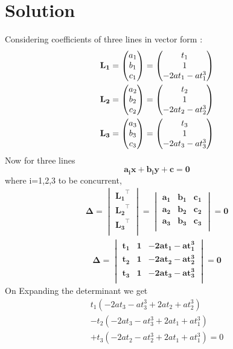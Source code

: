 \documentclass[journal,12pt,twocolumn]{IEEEtran}
\begin{document}
\section*{\textbf{Solution}}
\noindent
Considering coefficients of three lines in vector form :
\begin{align}
   \mathbf{\mathbf{L_1}=\begin{pmatrix}a_1\\b_1\\c_1\end{pmatrix}=\begin{pmatrix}t_1\\1\\-2at_1-at_1^3\end{pmatrix}}\\
   \mathbf{\mathbf{L_2}=\begin{pmatrix}a_2\\b_2\\c_2\end{pmatrix}=\begin{pmatrix}t_2\\1\\- 2at_2 -at_2^3\end{pmatrix}}\\
   \mathbf{\mathbf{L_3}=\begin{pmatrix}a_3\\b_3\\c_3\end{pmatrix}=\begin{pmatrix}t_3\\1\\- 2at_3 -at_3^3\end{pmatrix}}\\
\end{align}
Now for three lines $$\mathbf{a_ix+b_iy+c=0}$$ where i=1,2,3 to be concurrent,
\begin{align}
\mathbf{\Delta=\begin{vmatrix}
\mathbf{L_1}^\intercal\\\mathbf{L_2}^\intercal\\\mathbf{L_3}^\intercal\\
\end{vmatrix}=
\begin{vmatrix}
a_1&b_1&c_1\\
a_2&b_2&c_2\\
a_3&b_3&c_3\\
\end{vmatrix}=0}
\end{align}
\begin{align}
\mathbf{\Delta=
\begin{vmatrix}
t_1&1&-2at_1-at_1^3\\
t_2&1&-2at_2-at_2^3\\
t_3&1&-2at_3-at_3^3\\
\end{vmatrix}=0}
\end{align}
On Expanding the determinant we get 
\begin{equation}
\begin{split}
t_1(-2at_3 -at_3^3 +2at_2+at_2^3)\\
-t_2(-2at_3 -at_3^3 +2at_1+at_1^3)\\
+t_3(-2at_2 -at_2^3 +2at_1+at_1^3)=0\\
\end{split}
\end{equation}
\end{document}
